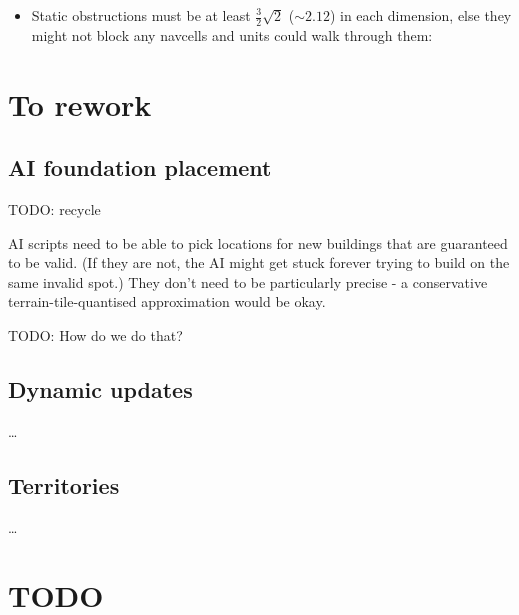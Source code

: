 \documentclass[a4paper,10pt]{article}
\begin{document}
\begin{itemize}
\item Static obstructions must be at least $\frac{3}{2}\sqrt{2}$ ($\sim2.12$)
in each dimension, else they might not block any navcells and units could
walk through them:


\end{itemize}

\section{To rework}
\subsection{AI foundation placement}

TODO: recycle

AI scripts need to be able to pick locations for new buildings that are guaranteed
to be valid. (If they are not, the AI might get stuck forever trying to build on the
same invalid spot.)
They don't need to be particularly precise - a conservative terrain-tile-quantised approximation
would be okay.

TODO: How do we do that?

\subsection{Dynamic updates}

\ldots

\subsection{Territories}

\ldots

\section{TODO}
\end{document}
